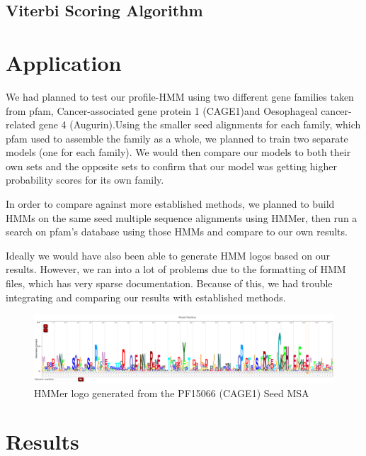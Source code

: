 \documentclass{article}
\begin{document}
\subsection{Viterbi Scoring Algorithm}



\section{Application}
We had planned to test our profile-HMM using two different gene families taken from pfam, Cancer-associated gene protein 1 (CAGE1)\footnotemark[3] and Oesophageal cancer-related gene 4 (Augurin).\footnotemark[4] Using the smaller seed alignments for each family, which pfam used to assemble the family as a whole, we planned to train two separate models (one for each family). We would then compare our models to both their own sets and the opposite sets to confirm that our model was getting higher probability scores for its own family.

In order to compare against more established methods, we planned to build HMMs on the same seed multiple sequence alignments using HMMer, then run a search on pfam's database using those HMMs and compare to our own results.

Ideally we would have also been able to generate HMM logos based on our results. However, we ran into a lot of problems due to the formatting of HMM files, which has very sparse documentation. Because of this, we had trouble integrating and comparing our results with established methods.

\begin{figure}[H]
\centering
\includegraphics[width=1.0\textwidth]{materials/HMMerLogo.png}
\caption{HMMer logo generated from the PF15066 (CAGE1) Seed MSA}
\end{figure}




\section{Results}
\end{document}
